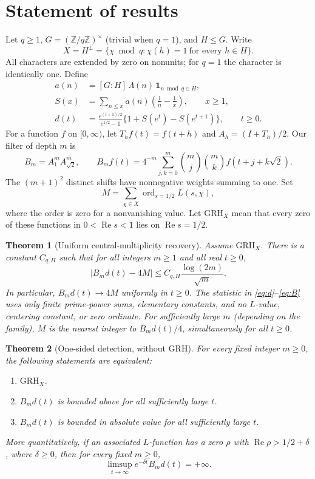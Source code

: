 \documentclass[11pt]{article}
\newtheorem{theorem}{Theorem}[section]
\theoremstyle{remark}\newtheorem{remark}[theorem]{Remark}
\newcommand{\Z}{\mathbb Z}
\newcommand{\ord}{\operatorname{ord}}
\newcommand{\Rea}{\operatorname{Re}}
\newcommand{\GRH}{\mathrm{GRH}}
\begin{document}
\section{Statement of results}
Let $q\ge1$, $G=(\Z/q\Z)^\times$ (trivial when $q=1$), and $H\le G$. Write
\[
 X=H^\perp=\{\chi\bmod q:\chi(h)=1\ \text{for every }h\in H\}.
\]
All characters are extended by zero on nonunits; for $q=1$ the character is identically one. Define
\begin{align}
 a(n)&=[G:H]\,\Lambda(n)\,\mathbf 1_{n\bmod q\in H},\nonumber\\
 S(x)&=\sum_{n\le x}a(n)\left(\frac1n-\frac1x\right),\qquad x\ge1,\label{eq:S}\\
 d(t)&=\frac{e^{(t+1)/2}}{e^{1/2}-1}\{1+S(e^t)-S(e^{t+1})\},\qquad t\ge0.\label{eq:d}
\end{align}
For a function $f$ on $[0,\infty)$, let $T_hf(t)=f(t+h)$ and $A_h=(I+T_h)/2$. Our filter of depth $m$ is
\begin{equation}\label{eq:B}
 B_m=A_1^m A_{\sqrt2}^m,\qquad
 B_m f(t)=4^{-m}\sum_{j,k=0}^m\binom mj\binom mk f(t+j+k\sqrt2).
\end{equation}
The $(m+1)^2$ distinct shifts have nonnegative weights summing to one. Set
\[
 M=\sum_{\chi\in X}\ord_{s=1/2} L(s,\chi),
\]
where the order is zero for a nonvanishing value. Let $\GRH_X$ mean that every zero of these functions in $0<\Rea s<1$ lies on $\Rea s=1/2$.

\begin{theorem}[Uniform central-multiplicity recovery]\label{th:main}
Assume $\GRH_X$. There is a constant $C_{q,H}$ such that for all integers $m\ge1$ and all real $t\ge0$,
\begin{equation}\label{eq:main}
 |B_m d(t)-4M|\le C_{q,H}\frac{\log(2m)}{\sqrt m}.
\end{equation}
In particular, $B_m d(t)\to4M$ uniformly in $t\ge0$. The statistic in \eqref{eq:d}--\eqref{eq:B} uses only finite prime-power sums, elementary constants, and no $L$-value, centering constant, or zero ordinate. For sufficiently large $m$ (depending on the family), $M$ is the nearest integer to $B_m d(t)/4$, simultaneously for all $t\ge0$.
\end{theorem}

\begin{theorem}[One-sided detection, without GRH]\label{th:converse}
For every fixed integer $m\ge0$, the following statements are equivalent:
\begin{enumerate}
\item $\GRH_X$.
\item $B_m d(t)$ is bounded above for all sufficiently large $t$.
\item $B_m d(t)$ is bounded in absolute value for all sufficiently large $t$.
\end{enumerate}
More quantitatively, if an associated $L$-function has a zero $\rho$ with $\Rea\rho>1/2+\delta$, where $\delta\ge0$, then for every fixed $m\ge0$,
\begin{equation}\label{eq:blowup}
 \limsup_{t\to\infty}e^{-\delta t}B_m d(t)=+\infty.
\end{equation}
\end{theorem}
\end{document}
